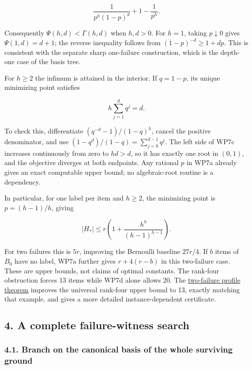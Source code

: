 \[
\frac1{p^h(1-p)^d}+1-\frac1{p^h}.
\]

Consequently \(\Psi(h,d)<\Gamma(h,d)\) when \(h,d>0\). For \(h=1\), taking \(p\downarrow0\) gives \(\Psi(1,d)=d+1\); the reverse inequality follows from \((1-p)^{-d}\ge1+dp\). This is consistent with the separate sharp one-failure construction, which is the depth-one case of the basis tree.

For \(h\ge2\) the infimum is attained in the interior. If \(q=1-p\), its unique minimizing point satisfies

\[
h\sum_{j=1}^{d}q^j=d.
\tag{WP7c}
\]

To check this, differentiate \((q^{-d}-1)/(1-q)^h\), cancel the positive denominator, and use \((1-q^d)/(1-q)=\sum_{j=0}^{d-1}q^j\). The left side of WP7c increases continuously from zero to \(hd>d\), so it has exactly one root in \((0,1)\), and the objective diverges at both endpoints. Any rational \(p\) in WP7a already gives an exact computable upper bound; no algebraic-root routine is a dependency.

In particular, for one label per item and \(h\ge2\), the minimizing point is \(p=(h-1)/h\), giving

\[
\boxed{
|H_*|\le r\left(1+
\frac{h^h}{(h-1)^{h-1}}\right).}
\tag{WP7d}
\]

For two failures this is \(5r\), improving the Bernoulli baseline \(27r/4\). If \(b\) items of \(B_0\) have no label, WP7a further gives \(r+4(r-b)\) in this two-failure case. These are upper bounds, not claims of optimal constants. The rank-four obstruction forces 13 items while WP7d alone allows 20. The \href{https://github.com/icekylinx/algorithm-frontier/blob/main/problems/matroid-failure-summaries/manuscripts/two-failure-oracle-prefix-bounds.md}{two-failure profile theorem} improves the universal rank-four upper bound to 13, exactly matching that example, and gives a more detailed instance-dependent certificate.

\hypertarget{af-eb38c0014f-a-complete-failure-witness-search}{%
\subsection{4. A complete failure-witness search}\label{af-eb38c0014f-a-complete-failure-witness-search}}

\hypertarget{af-eb38c0014f-branch-on-the-canonical-basis-of-the-whole-surviving-ground}{%
\subsubsection{4.1. Branch on the canonical basis of the whole surviving ground}\label{af-eb38c0014f-branch-on-the-canonical-basis-of-the-whole-surviving-ground}}

